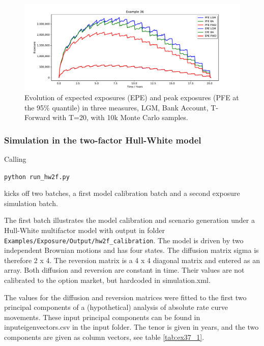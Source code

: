 \begin{figure}[h!]
\begin{center}
\includegraphics[scale=0.45]{examples/mpl_exposures_measures.pdf}
\end{center}
\caption{Evolution of expected exposures (EPE) and peak exposures (PFE at the 95\% quantile) in three measures, LGM,
  Bank Account, T-Forward with T=20, with 10k Monte Carlo samples.}
\label{fig:36}
\end{figure}

\subsubsection{Simulation in the two-factor Hull-White model}\label{example:exposure_hw2f}

Calling

\medskip
\centerline{\tt python run\_hw2f.py } 
\medskip

kicks off two batches, a first model calibration batch and a second exposure simulation batch.

The first batch illustrates the model calibration and scenario generation under a Hull-White multifactor
model with output in folder {\tt Examples/Exposure/Output/hw2f\_calibration}.
The model is driven by two independent Brownian motions and has four states. The diffusion matrix sigma is
therefore 2 x 4. The reversion matrix is a 4 x 4 diagonal matrix and entered as an array. Both diffusion and reversion
are constant in time. Their values are not calibrated to the option market, but hardcoded in simulation.xml.

The values for the diffusion and reversion matrices were fitted to the first two principal components of a
(hypothetical) analysis of absolute rate curve movements. These input principal components can be found in
inputeigenvectors.csv in the input folder. The tenor is given in years, and the two components are given as column
vectors, see table \ref{tab:ex37_1}.

